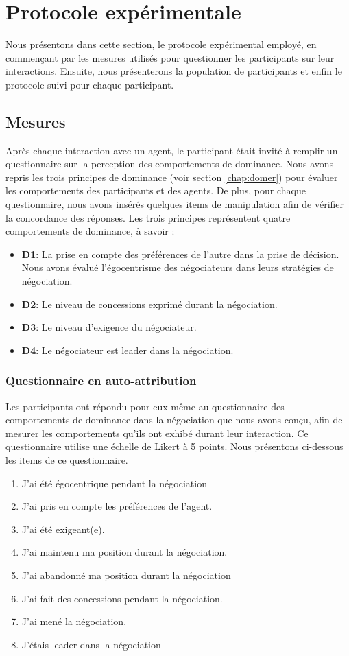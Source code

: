 \section{Protocole expérimentale}
\label{sec:procedure}
Nous présentons dans cette section, le protocole expérimental employé, en commençant par les mesures utilisés pour questionner les participants sur leur interactions. Ensuite, nous présenterons la population de participants et enfin le protocole suivi pour chaque participant. 

\subsection{Mesures}
Après chaque interaction avec un agent, le participant était invité à remplir un questionnaire sur la perception des comportements de dominance.
Nous avons repris les trois principes de dominance (voir section \ref{chap:domer}) pour évaluer les comportements des participants et des agents. De plus, pour chaque questionnaire, nous avons insérés quelques items de manipulation afin de vérifier la concordance des réponses.  Les trois principes représentent quatre comportements de dominance, à savoir :
	\begin{itemize}
		\item \textbf{D1}: La prise en compte des préférences de l'autre dans la prise de décision. Nous avons évalué l'égocentrisme des négociateurs dans leurs stratégies de négociation. 
		\item \textbf{D2}: Le niveau de concessions exprimé durant la négociation.
		\item \textbf{D3}: Le niveau d'exigence du négociateur.
		\item \textbf{D4}: Le négociateur est leader dans la négociation.
	\end{itemize}

\subsubsection{Questionnaire en auto-attribution} Les participants ont répondu pour eux-même au questionnaire des comportements de dominance dans la négociation que nous avons conçu, afin de mesurer les comportements qu'ils ont exhibé durant leur interaction. Ce questionnaire utilise une échelle de Likert à 5 points. Nous présentons ci-dessous les items de ce questionnaire. 
\begin{enumerate}
	\item J'ai été égocentrique pendant la négociation
	\item J'ai pris en compte les préférences de l'agent.
	\item J'ai été exigeant(e).
	\item J'ai maintenu ma position durant la négociation.
	\item J'ai abandonné ma position durant la négociation
	\item J'ai fait des concessions pendant la négociation.	
	\item J'ai mené la négociation.
	\item J'étais leader dans la négociation
\end{enumerate}

